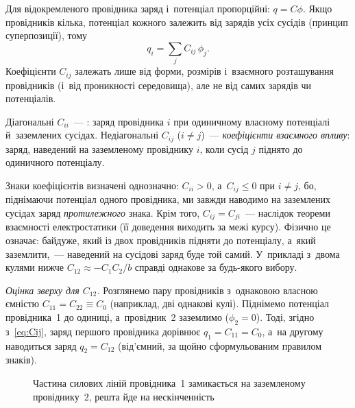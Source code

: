 \begin{Extra}
Для відокремленого провідника заряд і~потенціал пропорційні: \(q = C\phi\). Якщо провідників
кілька, потенціал кожного залежить від зарядів усіх сусідів (принцип суперпозиції), тому
\begin{equation}\label{eq:Cij}
	q_i = \sum_j C_{ij}\,\phi_j.
\end{equation}
Коефіцієнти \(C_{ij}\) залежать лише від форми, розмірів і~взаємного розташування
провідників (і~від проникності середовища), але не від самих зарядів чи потенціалів.

Діагональні \(C_{ii}\)~--- : заряд провідника \(i\) при одиничному
власному потенціалі й~заземлених сусідах. Недіагональні \(C_{ij}\) (\(i\neq j\))~---
\emph{коефіцієнти взаємного впливу}: заряд, наведений на заземленому провіднику \(i\),
коли сусід \(j\) піднято до одиничного потенціалу.

Знаки коефіцієнтів визначені однозначно: \(C_{ii}>0\), а~\(C_{ij}\le 0\) при \(i\neq j\),
бо, піднімаючи потенціал одного провідника, ми завжди наводимо на заземлених сусідах заряд
\emph{протилежного} знака. Крім того, \(C_{ij}=C_{ji}\)~--- наслідок теореми взаємності
електростатики (її доведення виходить за межі курсу). Фізично це означає: байдуже, який
із двох провідників підняти до потенціалу, а~який заземлити,~--- наведений на сусідові заряд
буде той самий. У~прикладі з~двома кулями нижче \(C_{12}\approx -C_1C_2/b\) справді
однакове за будь-якого вибору.

\emph{Оцінка зверху для \(C_{12}\).} Розглянемо пару провідників з~однаковою власною
ємністю \(C_{11}=C_{22}\equiv C_0\) (наприклад, дві однакові кулі). Піднімемо потенціал
провідника~1 до одиниці, а~провідник~2 заземлимо (\(\phi_2=0\)). Тоді, згідно
з~\eqref{eq:Cij}, заряд першого провідника дорівнює \(q_1=C_{11}=C_0\), а~на другому
наводиться заряд \(q_2=C_{12}\) (від'ємний, за щойно сформульованим правилом знаків).

\end{Extra}

	\begin{figure}\centering
		\caption{Частина силових ліній провідника~1 замикається на заземленому
		провіднику~2, решта йде на нескінченність\label{pic:FieldLinesBound}}
	\end{figure}

